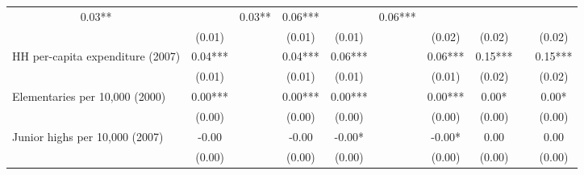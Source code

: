 \begin{tabular}{llllllllll}
  \multicolumn{1}{c}{0.03** } &
  \multicolumn{1}{c}{} &
  \multicolumn{1}{c}{0.03** } &
  \multicolumn{1}{c}{0.06***} &
  \multicolumn{1}{c}{} &
  \multicolumn{1}{c}{0.06***} \\
\multicolumn{1}{l}{} &
  \multicolumn{1}{|c}{(0.01)} &
  \multicolumn{1}{c}{} &
  \multicolumn{1}{c}{(0.01)} &
  \multicolumn{1}{c}{(0.01)} &
  \multicolumn{1}{c}{} &
  \multicolumn{1}{c}{(0.02)} &
  \multicolumn{1}{c}{(0.02)} &
  \multicolumn{1}{c}{} &
  \multicolumn{1}{c}{(0.02)} \\
\multicolumn{1}{l}{HH per-capita expenditure (2007)} &
  \multicolumn{1}{|c}{0.04***} &
  \multicolumn{1}{c}{} &
  \multicolumn{1}{c}{0.04***} &
  \multicolumn{1}{c}{0.06***} &
  \multicolumn{1}{c}{} &
  \multicolumn{1}{c}{0.06***} &
  \multicolumn{1}{c}{0.15***} &
  \multicolumn{1}{c}{} &
  \multicolumn{1}{c}{0.15***} \\
\multicolumn{1}{l}{} &
  \multicolumn{1}{|c}{(0.01)} &
  \multicolumn{1}{c}{} &
  \multicolumn{1}{c}{(0.01)} &
  \multicolumn{1}{c}{(0.01)} &
  \multicolumn{1}{c}{} &
  \multicolumn{1}{c}{(0.01)} &
  \multicolumn{1}{c}{(0.02)} &
  \multicolumn{1}{c}{} &
  \multicolumn{1}{c}{(0.02)} \\
\multicolumn{1}{l}{Elementaries per 10,000 (2000)} &
  \multicolumn{1}{|c}{0.00***} &
  \multicolumn{1}{c}{} &
  \multicolumn{1}{c}{0.00***} &
  \multicolumn{1}{c}{0.00***} &
  \multicolumn{1}{c}{} &
  \multicolumn{1}{c}{0.00***} &
  \multicolumn{1}{c}{0.00* } &
  \multicolumn{1}{c}{} &
  \multicolumn{1}{c}{0.00* } \\
\multicolumn{1}{l}{} &
  \multicolumn{1}{|c}{(0.00)} &
  \multicolumn{1}{c}{} &
  \multicolumn{1}{c}{(0.00)} &
  \multicolumn{1}{c}{(0.00)} &
  \multicolumn{1}{c}{} &
  \multicolumn{1}{c}{(0.00)} &
  \multicolumn{1}{c}{(0.00)} &
  \multicolumn{1}{c}{} &
  \multicolumn{1}{c}{(0.00)} \\
\multicolumn{1}{l}{Junior highs per 10,000 (2007)} &
  \multicolumn{1}{|c}{-0.00 } &
  \multicolumn{1}{c}{} &
  \multicolumn{1}{c}{-0.00 } &
  \multicolumn{1}{c}{-0.00* } &
  \multicolumn{1}{c}{} &
  \multicolumn{1}{c}{-0.00* } &
  \multicolumn{1}{c}{0.00 } &
  \multicolumn{1}{c}{} &
  \multicolumn{1}{c}{0.00 } \\
\multicolumn{1}{l}{} &
  \multicolumn{1}{|c}{(0.00)} &
  \multicolumn{1}{c}{} &
  \multicolumn{1}{c}{(0.00)} &
  \multicolumn{1}{c}{(0.00)} &
  \multicolumn{1}{c}{} &
  \multicolumn{1}{c}{(0.00)} &
  \multicolumn{1}{c}{(0.00)} &
  \multicolumn{1}{c}{} &
  \multicolumn{1}{c}{(0.00)} \\

\end{tabular}
